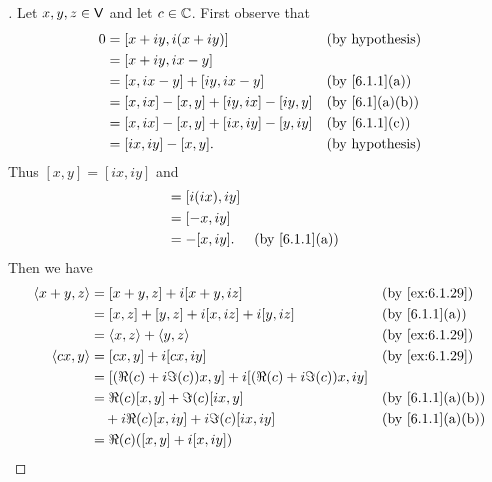 \begin{proof}[]
  Let \(x, y, z \in \mathsf{V}\) and let \(c \in \mathbb{C}\).
  First observe that
  \begin{align*}
    0 & = [x + iy, i(x + iy)]                   &  & \text{(by hypothesis)}       \\
      & = [x + iy, ix - y]                                                        \\
      & = [x, ix - y] + [iy, ix - y]            &  & \text{(by \cref{6.1.1}(a))}  \\
      & = [x, ix] - [x, y] + [iy, ix] - [iy, y] &  & \text{(by \cref{6.1}(a)(b))} \\
      & = [x, ix] - [x, y] + [ix, iy] - [y, iy] &  & \text{(by \cref{6.1.1}(c))}  \\
      & = [ix, iy] - [x, y].                    &  & \text{(by hypothesis)}
  \end{align*}
  Thus \([x, y] = [ix, iy]\) and
  \begin{align*}
    [ix, y] & = [i(ix), iy]                                  \\
            & = [-x, iy]                                     \\
            & = -[x, iy].   &  & \text{(by \cref{6.1.1}(a))}
  \end{align*}
  Then we have
  \begin{align*}
    \inn{x + y, z}    & = [x + y, z] + i[x + y, iz]                                 &  & \text{(by \cref{ex:6.1.29})}   \\
                      & = [x, z] + [y, z] + i[x, iz] + i[y, iz]                     &  & \text{(by \cref{6.1.1}(a))}    \\
                      & = \inn{x, z} + \inn{y, z}                                   &  & \text{(by \cref{ex:6.1.29})}   \\
    \inn{cx, y}       & = [cx, y] + i[cx, iy]                                       &  & \text{(by \cref{ex:6.1.29})}   \\
                      & = [(\Re(c) + i \Im(c)) x, y] + i[(\Re(c) + i \Im(c)) x, iy]                                     \\
                      & = \Re(c) [x, y] + \Im(c) [ix, y]                            &  & \text{(by \cref{6.1.1}(a)(b))} \\
                      & \quad + i \Re(c) [x, iy] + i \Im(c) [ix, iy]                &  & \text{(by \cref{6.1.1}(a)(b))} \\
                      & = \Re(c) ([x, y] + i[x, iy])                                                                    \\

\end{align*}
\end{proof}
